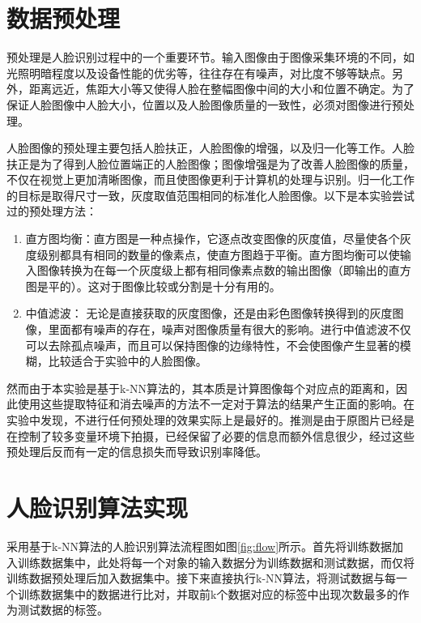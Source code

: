 \documentclass{article}
\begin{document}
\section{数据预处理}
\label{sec:shu_ju_yu_chu_li_}
\par 预处理是人脸识别过程中的一个重要环节。输入图像由于图像采集环境的不同，如光照明暗程度以及设备性能的优劣等，往往存在有噪声，对比度不够等缺点。另外，距离远近，焦距大小等又使得人脸在整幅图像中间的大小和位置不确定。为了保证人脸图像中人脸大小，位置以及人脸图像质量的一致性，必须对图像进行预处理。
\par 人脸图像的预处理主要包括人脸扶正，人脸图像的增强，以及归一化等工作。人脸扶正是为了得到人脸位置端正的人脸图像；图像增强是为了改善人脸图像的质量，不仅在视觉上更加清晰图像，而且使图像更利于计算机的处理与识别。归一化工作的目标是取得尺寸一致，灰度取值范围相同的标准化人脸图像。以下是本实验尝试过的预处理方法：
\begin{enumerate}
    \item 直方图均衡：直方图是一种点操作，它逐点改变图像的灰度值，尽量使各个灰度级别都具有相同的数量的像素点，使直方图趋于平衡。直方图均衡可以使输入图像转换为在每一个灰度级上都有相同像素点数的输出图像（即输出的直方图是平的）。这对于图像比较或分割是十分有用的。
    \item 中值滤波： 无论是直接获取的灰度图像，还是由彩色图像转换得到的灰度图像，里面都有噪声的存在，噪声对图像质量有很大的影响。进行中值滤波不仅可以去除孤点噪声，而且可以保持图像的边缘特性，不会使图像产生显著的模糊，比较适合于实验中的人脸图像。
\end{enumerate}
\par 然而由于本实验是基于k-NN算法的，其本质是计算图像每个对应点的距离和，因此使用这些提取特征和消去噪声的方法不一定对于算法的结果产生正面的影响。在实验中发现，不进行任何预处理的效果实际上是最好的。推测是由于原图片已经是在控制了较多变量环境下拍摄，已经保留了必要的信息而额外信息很少，经过这些预处理后反而有一定的信息损失而导致识别率降低。

\section{人脸识别算法实现}
\label{sec:tui_jian_suan_fa_shi_xian_}
\par 采用基于k-NN算法的人脸识别算法流程图如图\ref{fig:flow}所示。首先将训练数据加入训练数据集中，此处将每一个对象的输入数据分为训练数据和测试数据，而仅将训练数据预处理后加入数据集中。接下来直接执行k-NN算法，将测试数据与每一个训练数据集中的数据进行比对，并取前k个数据对应的标签中出现次数最多的作为测试数据的标签。
\end{document}
